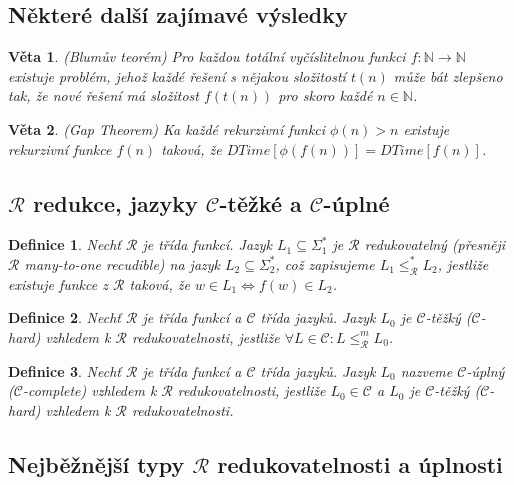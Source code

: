 \documentclass[a4paper, 11pt]{report}
\newtheorem{mydef}{Definice}[chapter]
\newtheorem{veta}{Věta}[chapter]
\begin{document}
\subsection{Některé další zajímavé výsledky}

\begin{veta}
(Blumův teorém) Pro každou totální vyčíslitelnou funkci $f: \mathbb{N} \to \mathbb{N}$ existuje problém, jehož každé řešení s nějakou složitostí $t(n)$ může bát zlepšeno tak, že nové řešení má složitost $f(t(n))$ pro skoro každé $n \in \mathbb{N}$.
\end{veta}

\begin{veta}
(Gap Theorem) Ka každé rekurzivní funkci $\phi(n) > n$ existuje rekurzivní funkce $f(n)$ taková, že $DTime[\phi(f(n))] = DTime[f(n)]$.
\end{veta}

\subsection{$\mathcal{R}$ redukce, jazyky $\mathcal{C}$-těžké a $\mathcal{C}$-úplné}

\begin{mydef}
Nechť $\mathcal{R}$ je třída funkcí. Jazyk $L_1 \subseteq \Sigma_1^*$ je $\mathcal{R}$ redukovatelný (přesněji $\mathcal{R}$ many-to-one recudible) na jazyk $L_2 \subseteq \Sigma_2^*$, což zapisujeme $L_1 \leq_\mathcal{R}^* L_2$, jestliže existuje funkce z $\mathcal{R}$ taková, že $w \in L_1 \Leftrightarrow f(w) \in L_2$.
\end{mydef}

\begin{mydef}
Nechť $\mathcal{R}$ je třída funkcí a $\mathcal{C}$ třída jazyků. Jazyk $L_0$ je $\mathcal{C}$-těžký ($\mathcal{C}$-hard) vzhledem k $\mathcal{R}$ redukovatelnosti, jestliže $\forall L \in \mathcal{C}: L \leq_\mathcal{R}^m L_0$.
\end{mydef}

\begin{mydef}
Nechť $\mathcal{R}$ je třída funkcí a $\mathcal{C}$ třída jazyků. Jazyk $L_0$ nazveme $\mathcal{C}$-úplný ($\mathcal{C}$-complete) vzhledem k $\mathcal{R}$ redukovatelnosti, jestliže $L_0 \in \mathcal{C}$ a $L_0$ je $\mathcal{C}$-těžký ($\mathcal{C}$-hard) vzhledem k $\mathcal{R}$ redukovatelnosti.
\end{mydef}

\subsection{Nejběžnější typy $\mathcal{R}$ redukovatelnosti a úplnosti}
\end{document}
